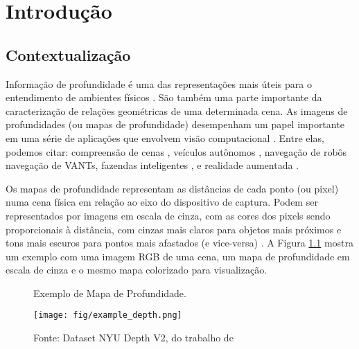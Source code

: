 
\chapter{Introdução}

\section{Contextualização}

Informação de profundidade é uma das representações mais úteis para o entendimento de ambientes físicos \cite{lasinger2019towards} \cite{zhou2019does}. São também uma parte importante da caracterização de relações geométricas de uma determinada cena. As imagens de profundidades (ou mapas de profundidade) desempenham um papel importante em uma série de aplicações que envolvem visão computacional \cite{eigen2014depth}.  Entre elas, podemos citar: compreensão de cenas \cite{jaritz2018sparse}, veículos autônomos \cite{song2021self}, navegação de robôs \cite{ma2019sparse} navegação de VANTs, \cite{padhy2023monocular} fazendas inteligentes \cite{farkhani2019sparse}, e realidade aumentada \cite{du2020depthlab}. 


Os mapas de profundidade representam as distâncias de cada ponto (ou pixel) numa cena física em relação ao eixo do dispositivo de captura. Podem ser representados por imagens em escala de cinza, com as cores dos pixels sendo proporcionais à distância, com cinzas mais claros para objetos mais próximos e tons mais escuros para pontos mais afastados (e vice-versa) \cite{dourado2020multi}. A Figura \ref{mapintro} mostra um exemplo com uma imagem RGB de uma cena, um mapa de profundidade em escala de cinza e o mesmo mapa colorizado para visualização.

\begin{figure}[h]
    \centering   
    \caption{Exemplo de Mapa de Profundidade.}
    \texttt{[image: fig/example\_depth.png]}
    \caption*{Fonte: Dataset NYU Depth V2, do trabalho de }
    \label{mapintro}
\end{figure}




